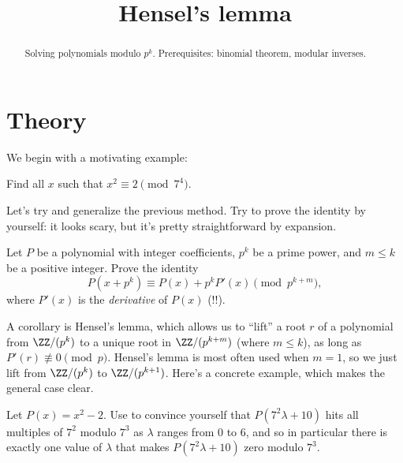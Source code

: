 \documentclass[11pt]{scrartcl}
\title{Hensel's lemma}
\begin{document}
\maketitle

\begin{abstract}
    Solving polynomials modulo $p^k$. Prerequisites: binomial theorem, modular inverses.
\end{abstract}

\section{Theory}

We begin with a motivating example:

\begin{example}\label{exa:sqrt2}
    Find all $x$ such that $x^2 \equiv 2 \pmod{7^4}$.
\end{example}

Let's try and generalize the previous method. Try to prove the identity by yourself: it looks scary, but it's pretty straightforward by expansion.

\begin{exercise}\label{exa:identity}
    Let $P$ be a polynomial with integer coefficients, $p^k$ be a prime power, and $m \le k$ be a positive integer. Prove the identity
    \begin{equation}\label{equ:identity}
		P(x + p^k) \equiv P(x) + p^kP'(x) \pmod{p^{k + m}},
	\end{equation}
    where $P'(x)$ is the \emph{derivative} of $P(x)$ (!!).
\end{exercise}

A corollary is Hensel's lemma, which allows us to ``lift'' a root $r$ of a polynomial from $\ZZ/(p^k)$ to a unique root in $\ZZ/(p^{k + m})$ (where $m \le k$), as long as $P'(r) \not\equiv 0 \pmod p$. Hensel's lemma is most often used when $m = 1$, so we just lift from $\ZZ/(p^k)$ to $\ZZ/(p^{k + 1})$. Here's a concrete example, which makes the general case clear.

\begin{example}\label{exa:hensel_example}
	Let $P(x) = x^2 - 2$. Use  to convince yourself that $P(7^2\lambda + 10)$ hits all multiples of $7^2$ modulo $7^3$ as $\lambda$ ranges from $0$ to $6$, and so in particular there is exactly one value of $\lambda$ that makes $P(7^2\lambda + 10)$ zero modulo $7^3$.
\end{example}
\end{document}
